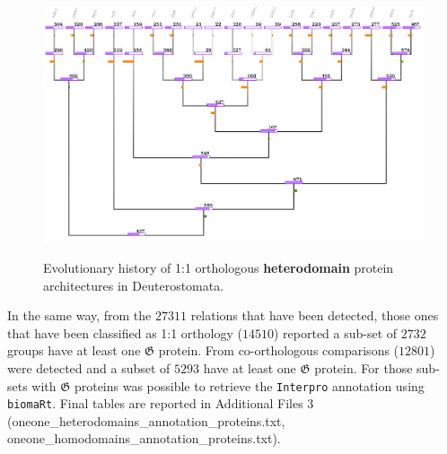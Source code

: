 \documentclass[11pt]{article}
\newcommand{\TODO}[1]{\begingroup\color{red}#1\endgroup}
\begin{document}
\begin{figure}[ht!]
\centering
\includegraphics[scale=0.53]{figures/provisionalDolloHeterodomains} \\
\caption{Evolutionary history of 1:1 orthologous \textbf{heterodomain} protein 
architectures in Deuterostomata.}\label{fig:dollooneoneheterodomain}
\end{figure}

In the same way, from the $27311$ relations that have been detected, 
those ones that have been classified as 1:1 orthology ($14510$) reported a 
sub-set of $2732$ groups have at least one $\boldsymbol{\mathfrak{G}}$ protein.
From co-orthologous comparisons ($12801$) were detected and a subset 
of $5293$ have at least one $\boldsymbol{\mathfrak{G}}$ protein. 
For those sub-sets with $\boldsymbol{\mathfrak{G}}$ proteins was possible 
to retrieve the \texttt{Interpro} annotation using \texttt{biomaRt}. 
\TODO{Final tables are reported in Additional Files 3 (oneone\_heterodomains\_annotation\_proteins.txt, oneone\_homodomains\_annotation\_proteins.txt)}.
\end{document}
